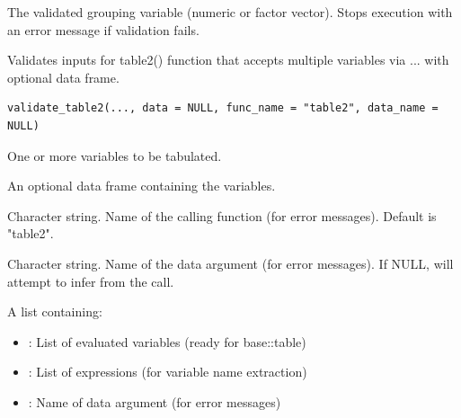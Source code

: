 \documentclass[a4paper]{book}
\begin{document}
%
\begin{Value}
The validated grouping variable (numeric or factor vector). Stops execution with an error message if validation fails.
\end{Value}
%
\begin{Description}
Validates inputs for table2() function that accepts multiple variables via ...
with optional data frame.
\end{Description}
%
\begin{Usage}
\begin{verbatim}
validate_table2(..., data = NULL, func_name = "table2", data_name = NULL)
\end{verbatim}
\end{Usage}
%
\begin{Arguments}
\begin{ldescription}
\item[\code{...}] One or more variables to be tabulated.

\item[\code{data}] An optional data frame containing the variables.

\item[\code{func\_name}] Character string. Name of the calling function (for error messages).
Default is "table2".

\item[\code{data\_name}] Character string. Name of the data argument (for error messages).
If NULL, will attempt to infer from the call.
\end{ldescription}
\end{Arguments}
%
\begin{Value}
A list containing:
\begin{itemize}

\item{} : List of evaluated variables (ready for base::table)
\item{} : List of expressions (for variable name extraction)
\item{} : Name of data argument (for error messages)

\end{itemize}

\end{Value}
\end{document}
